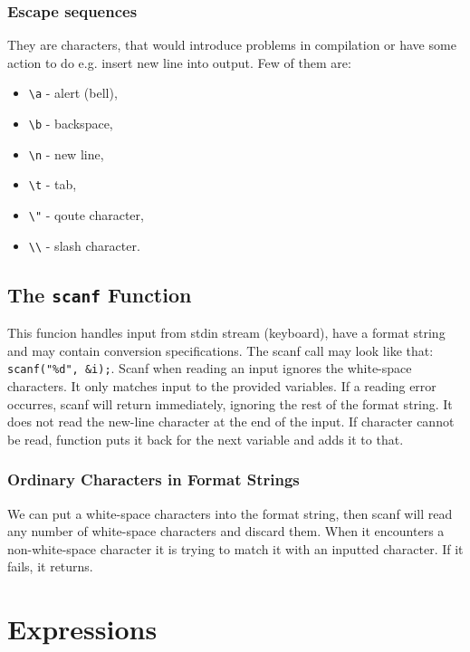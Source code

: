 \documentclass[openany]{book}
\begin{document}
    \subsection*{Escape sequences}
    They are characters, that would introduce problems in compilation or have some action
    to do e.g. insert new line into output. Few of them are:
    \begin{itemize}
        \item \texttt{\textbackslash a} - alert (bell),
        \item \texttt{\textbackslash b} - backspace,
        \item \texttt{\textbackslash n} - new line,
        \item \texttt{\textbackslash t} - tab,
        \item \texttt{\textbackslash "} - qoute character,
        \item \texttt{\textbackslash\textbackslash} - slash character.
    \end{itemize}

    \section{The \texttt{scanf} Function}
    This funcion handles input from stdin stream (keyboard),  have a format string
    and may contain conversion specifications. The scanf call may look like that:
    \texttt{scanf("\%d", \&i);}. Scanf when reading an input ignores the white-space
    characters. It only matches input to the provided variables. If a reading error
    occurres, scanf will return immediately, ignoring the rest of the format string.
    It does not read the new-line character at the end of the input. If character
    cannot be read, function puts it back for the next variable and adds it to that.

    \subsection*{Ordinary Characters in Format Strings}
    We can put a white-space characters into the format string, then scanf will read
    any number of white-space characters and discard them. When it encounters a
    non-white-space character it is trying to match it with an inputted character.
    If it fails, it returns.

    \chapter{Expressions}
\end{document}
